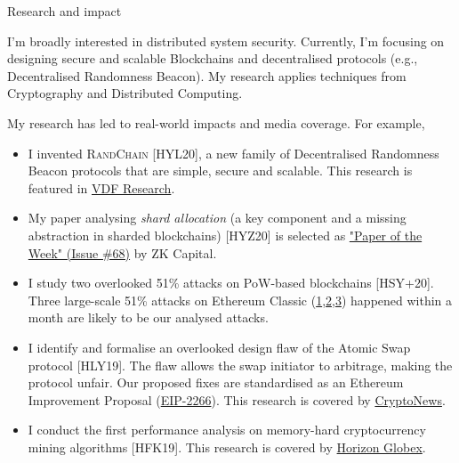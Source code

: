 \documentclass{resume} %
\begin{document}
\begin{rSection}{Research and impact}

I'm broadly interested in distributed system security.
Currently, I'm focusing on designing secure and scalable Blockchains and decentralised protocols (e.g., Decentralised Randomness Beacon).
My research applies techniques from Cryptography and Distributed Computing.

My research has led to real-world impacts and media coverage. For example,
\begin{itemize}
    \item I invented \textsc{RandChain} [HYL20], a new family of Decentralised Randomness Beacon protocols that are simple, secure and scalable. This research  is featured in \href{https://vdfresearch.org/}{VDF Research}.
    \item My paper analysing \emph{shard allocation} (a key component and a missing abstraction in sharded blockchains) [HYZ20] is selected as \href{https://zkcapital.substack.com/}{"Paper of the Week" (Issue \#68)} by ZK Capital.
    \item I study two overlooked 51\% attacks on PoW-based blockchains [HSY+20]. Three large-scale 51\% attacks on Ethereum Classic (\href{https://news.bitcoin.com/ethereum-classic-suffers-51-attack-again-delisting-risk-amplified}{1},\href{https://decrypt.co/40196/hackers-launch-third-51-attack-on-ethereum-classic-this-month}{2},\href{https://coingeek.com/over-1m-double-spent-in-latest-ethereum-classic-51-attack}{3}) happened within a month are likely to be our analysed attacks.
    \item I identify and formalise an overlooked design flaw of the Atomic Swap protocol [HLY19]. The flaw allows the swap initiator to arbitrage, making the protocol unfair. Our proposed fixes are standardised as an Ethereum Improvement Proposal (\href{https://github.com/ethereum/EIPs/issues/2266}{EIP-2266}). This research is covered by \href{https://cryptonews.com.au/monash-university-researchers-developing-cryptocurrency-transaction-platform}{CryptoNews}.
    \item I conduct the first performance analysis on memory-hard cryptocurrency mining algorithms [HFK19]. This research is covered by \href{https://medium.com/@horizonfintex/blockchain-research-bytes-1-9d023e080765}{Horizon Globex}.
\end{itemize}

\end{rSection}
\end{document}
